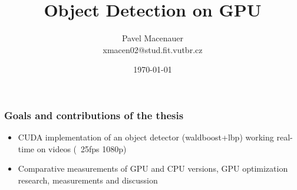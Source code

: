 \documentclass{beamer}
\title{\textbf{Object Detection on GPU}}
\author{
	\large{Pavel Macenauer} \\ 
	\tiny{xmacen02@stud.fit.vutbr.cz}
}
\date{\tiny{\today}}
\institute[FIT VUTBR]
{
	\inst{}
	Faculty of Information Technology \\
	Brno University of Technology
}
\begin{document}
	\begin{frame}[t,plain]
	\titlepage
	\tableofcontents[currentsection]
	\vspace{-10mm}
	\end{frame}

	
	
	
	\begin{frame}[t,fragile]
		\frametitle{Goals and contributions of the thesis}
		
		\begin{itemize}
			\item CUDA implementation of an object detector (waldboost+lbp) working real-time on videos (~25fps 1080p)
			\item Comparative measurements of GPU and CPU versions, GPU optimization research, measurements and discussion
		\end{itemize}		
		
	\end{frame}

\end{document}
